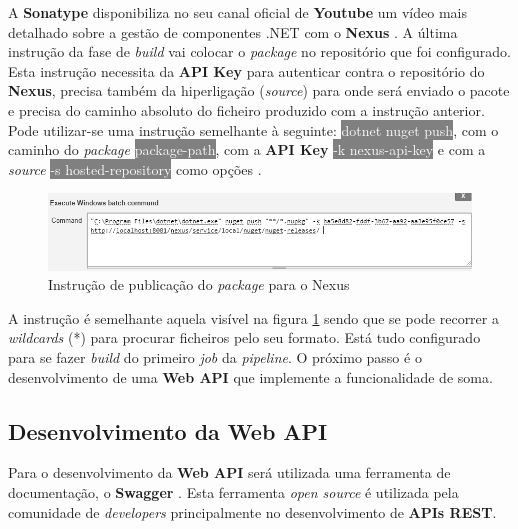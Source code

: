 \hspace{1cm}A \textbf{Sonatype} disponibiliza no seu canal oficial de \textbf{Youtube} um vídeo mais detalhado sobre a gestão de componentes .NET com o \textbf{Nexus} \cite{managingdotnetcomponentswithnexus}. A última instrução da fase de \textit{build} vai colocar o \textit{package} no repositório que foi configurado. Esta instrução necessita da \textbf{API Key} para autenticar contra o repositório do \textbf{Nexus}, precisa também da hiperligação (\textit{source}) para onde será enviado o pacote e precisa do caminho absoluto do ficheiro produzido com a instrução anterior. Pode utilizar-se uma instrução semelhante à seguinte:  \colorbox{gray}{\textcolor{white}{dotnet nuget push}}, com o caminho do \textit{package} \colorbox{gray}{\textcolor{white}{package-path}}, com a \textbf{API Key} \colorbox{gray}{\textcolor{white}{-k nexus-api-key}} e com a \textit{source} \colorbox{gray}{\textcolor{white}{-s hosted-repository}} como opções \cite{dotnetnuget}.

\begin{figure}[hbt!]
\centering
\includegraphics[width=0.9\linewidth]{Cap5/JenkinsPushToNexus.png}
\caption{Instrução de publicação do \textit{package} para o Nexus}
\label{Fig:Fig43}
\end{figure}

\hspace{1cm}A instrução é semelhante aquela visível na figura \ref{Fig:Fig43} sendo que se pode recorrer a \textit{wildcards} (*) para procurar ficheiros pelo seu formato. Está tudo configurado para se fazer \textit{build} do primeiro \textit{job} da \textit{pipeline}. O próximo passo é o desenvolvimento de uma \textbf{Web API} que implemente a funcionalidade de soma.

\subsection{Desenvolvimento da Web API}

\hspace{1cm}Para o desenvolvimento da \textbf{Web API} será utilizada uma ferramenta de documentação, o \textbf{Swagger} \cite{aboutswagger}. Esta ferramenta \textit{open source} é utilizada pela comunidade de \textit{developers} principalmente no desenvolvimento de \textbf{APIs REST}.

